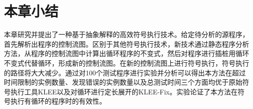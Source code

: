 %


\section{本章小结}
\label{sec-conclusion}
本章研究并提出了一种基于抽象解释的高效符号执行技术。给定待分析的源程序，首先解析出程序的控制流图。区别于其他符号执行技术，新技术通过静态程序分析方法，从程序的控制流图中计算出循环程序的不变式，然后对程序进行插桩用循环不变式代替循环，形成新的控制流图。在新的控制流图上进行符号执行，符号执行的路径将大大减少。通过对100个测试程序进行实验并分析可以得出本方法在超过时间限制的实例数量、发现错误的实例数量以及总测试时间三个方面均优于原始符号执行工具KLEE以及对循环进行定长展开的KLEE-Fix。实验论证了本方法在符号执行有循环的程序时的有效性。

